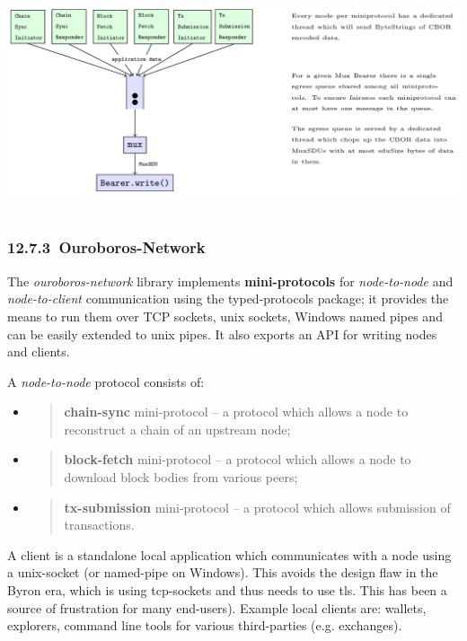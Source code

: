 \documentclass[]{article}
\begin{document}
~\includegraphics[width=6.27083in,height=2.59722in]{./media/image6.png}

\hypertarget{ouroboros-network}{%
\subsubsection{​12.7.3​~Ouroboros-Network}\label{ouroboros-network}}

The \emph{ouroboros-network} library implements \textbf{mini-protocols}
for \emph{node-to-node} and \emph{node-to-client} communication using
the typed-protocols package; it provides the means to run them over TCP
sockets, unix sockets, Windows named pipes and can be easily extended to
unix pipes. It also exports an API for writing nodes and clients.

A \emph{node-to-node} protocol consists of:

\begin{itemize}
\item
  \begin{quote}
  \textbf{chain-sync} mini-protocol -- a protocol which allows a node to
  reconstruct a chain of an upstream node;
  \end{quote}
\item
  \begin{quote}
  \textbf{block-fetch} mini-protocol -- a protocol which allows a node
  to download block bodies from various peers;
  \end{quote}
\item
  \begin{quote}
  \textbf{tx-submission} mini-protocol -- a protocol which allows
  submission of transactions.
  \end{quote}
\end{itemize}

A client is a standalone local application which communicates with a
node using a unix-socket (or named-pipe on Windows). This avoids the
design flaw in the Byron era, which is using tcp-sockets and thus needs
to use tls. This has been a source of frustration for many end-users).
Example local clients are: wallets, explorers, command line tools for
various third-parties (e.g. exchanges).
\end{document}
